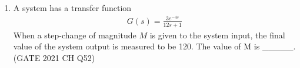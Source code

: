 \begin{enumerate}[label=\thechapter.\arabic*,ref=\thechapter.\theenumi]
\item A system has a transfer function
\begin{align}
    G(s) = \frac{3e^{-4s}}{12s + 1}\nonumber
\end{align}
When a step-change of magnitude $M$ is given to the system input, the final value of the system output is measured to be 120. The value of M is \_\_\_\_\_.
\hfill(GATE 2021 CH Q52)\\
\solution

\pagebreak
\end{enumerate}
